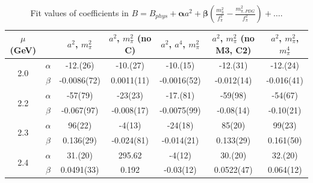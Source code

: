 \documentclass[12pt]{extarticle}
\begin{document}
\begin{table}[h!]
\begin{center}
\begin{tabular}{|c c|c|c|c|c|c|}
\hline
$\mu$ (GeV) &  & $a^2$, $m_\pi^2$& $a^2$, $m_\pi^2$ (no C)& $a^2$, $a^4$, $m_\pi^2$& $a^2$, $m_\pi^2$ (no M3, C2)& $a^2$, $m_\pi^2$, $m_\pi^4$\\
\hline
\multirow{2}{0.5in}{2.0} & $\alpha$ & -12.(26)& -10.(27)& -10.(15)& -12.(31)& -12.(24)\\
 & $\beta$ & -0.0086(72)& 0.0011(11)& -0.0016(52)& -0.012(14)& -0.016(41)\\
\hline
\multirow{2}{0.5in}{2.2} & $\alpha$ & -57(79)& -23(23)& -17.(81)& -59(98)& -54(67)\\
 & $\beta$ & -0.067(97)& -0.008(17)& -0.0075(99)& -0.08(14)& -0.10(21)\\
\hline
\multirow{2}{0.5in}{2.3} & $\alpha$ & 96(22)& -4(13)& -24(18)& 85(20)& 99(23)\\
 & $\beta$ & 0.136(29)& -0.024(81)& -0.014(21)& 0.133(29)& 0.161(50)\\
\hline
\multirow{2}{0.5in}{2.4} & $\alpha$ & 31.(20)& 295.62& -4(12)& 30.(20)& 32.(20)\\
 & $\beta$ & 0.0491(33)& 0.192& -0.03(12)& 0.0522(47)& 0.064(12)\\
\hline
\end{tabular}
\caption{Fit values of coefficients in $B = B_{phys} + \mathbf{\alpha} a^2 + \mathbf{\beta}\left(\frac{m_\pi^2}{f_\pi^2}-\frac{m_{\pi,PDG}^2}{f_\pi^2}\right) + \ldots$.}
\end{center}
\end{table}




















\clearpage
\end{document}
